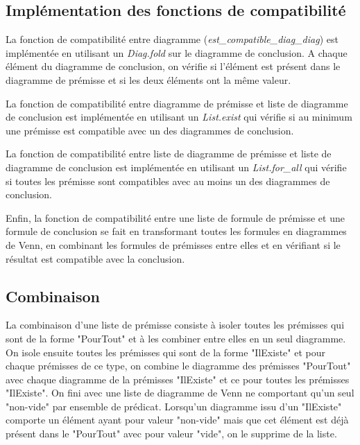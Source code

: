 \documentclass[12pt, letterpaper, french]{article}
\begin{document}
\subsection{Implémentation des fonctions de compatibilité}

La fonction de compatibilité entre diagramme (\emph{est\_compatible\_diag\_diag}) est implémentée en utilisant un \emph{Diag.fold} sur le diagramme de conclusion. A chaque élément du diagramme de conclusion, on vérifie si l'élément est présent dans le diagramme de prémisse et si les deux éléments ont la même valeur.

La fonction de compatibilité entre diagramme de prémisse et liste de diagramme de conclusion est implémentée en utilisant un \emph{List.exist} qui vérifie si
au minimum une prémisse est compatible avec un des diagrammes de conclusion.

La fonction de compatibilité entre liste de diagramme de prémisse et liste de 
diagramme de conclusion est implémentée en utilisant un \emph{List.for\_all} qui
vérifie si toutes les prémisse sont compatibles avec au moins un des diagrammes 
de conclusion.

Enfin, la fonction de compatibilité entre une liste de formule de prémisse et 
une formule de conclusion se fait en transformant toutes les formules en 
diagrammes de Venn, en combinant les formules de prémisses entre elles et en 
vérifiant si le résultat est compatible avec la conclusion.

\subsection{Combinaison}

La combinaison d'une liste de prémisse consiste à isoler toutes les prémisses 
qui sont de la forme "PourTout" et à les combiner entre elles en un seul 
diagramme. On isole ensuite toutes les prémisses qui sont de la forme "IlExiste"
et pour chaque prémisses de ce type, on combine le diagramme des prémisses 
"PourTout" avec chaque diagramme de la prémisses "IlExiste" et ce pour toutes 
les prémisses "IlExiste". On fini avec une liste de diagramme de Venn ne 
comportant qu'un seul "non-vide" par ensemble de prédicat. Lorsqu'un diagramme 
issu d'un "IlExiste" comporte un élément ayant pour valeur "non-vide" mais que cet élément est déjà présent dans le "PourTout" avec pour valeur "vide", on le supprime de la liste.
\end{document}
